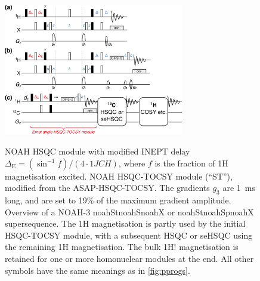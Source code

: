 \documentclass[11pt]{article}
\newcommand*{\noahthree}[3]{\csname noah#1\endcsname\csname noah#2\endcsname\csname noah#3\endcsname}
\newcommand*{\noahSt}{ST}
\newcommand*{\onejch}{1JCH}
\newcommand*{\magn}[1]{1H#1}
\newcommand*{\magnnot}[1]{1H!#1}
\begin{document}
\begin{refsection}
\begin{figure}
    \centering
    \includegraphics[width=0.7\textwidth]{pprogs_hsqct.png}
    {\label{fig:pprogs_hsqct_hsqc}}
    {\label{fig:pprogs_hsqct_hsqct}}
    {\label{fig:pprogs_hsqct_superseq}}
    \caption{
        \textbf{} NOAH HSQC module with modified INEPT delay $\Delta_{\mathrm{E}} = (\sin^{-1} f)/(4\cdot\onejch)$, where $f$ is the fraction of \magn{} magnetisation excited.
        \textbf{} NOAH HSQC-TOCSY module (``\noahSt{}''), modified from the ASAP-HSQC-TOCSY.\autocite{Becker2019JMR}
        The gradients $g_3$ are \SI{1}{\ms} long, and are set to 19\% of the maximum gradient amplitude.
        \textbf{} Overview of a NOAH-3 \noahthree{St}{S}{X} or \noahthree{St}{Sp}{X} supersequence.
        The \magn{} magnetisation is partly used by the initial HSQC-TOCSY module, with a subsequent HSQC or seHSQC using the remaining \magn{} magnetisation.
        The bulk \magnnot{} magnetisation is retained for one or more homonuclear modules at the end.
        All other symbols have the same meanings as in \cref{fig:pprogs}.
    }
    \label{fig:pprogs_hsqct}
\end{figure}


\end{refsection}
\end{document}
